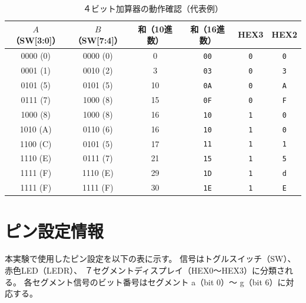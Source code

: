 \documentclass[12pt,a4paper]{ltjsarticle}
\begin{document}
\begin{table}[H]
  \centering
  \caption{４ビット加算器の動作確認（代表例）}
  \label{tab:adder4bits}
  \begin{tabular}{cc|cc|cc}
    \toprule
    $A$（SW{[3:0]}） & $B$（SW{[7:4]}） & 和（10進数） & 和（16進数） & HEX3 & HEX2 \\
    \midrule
    0000 (0) & 0000 (0) &  0 & \texttt{00} & \texttt{0} & \texttt{0} \\
    0001 (1) & 0010 (2) &  3 & \texttt{03} & \texttt{0} & \texttt{3} \\
    0101 (5) & 0101 (5) & 10 & \texttt{0A} & \texttt{0} & \texttt{A} \\
    0111 (7) & 1000 (8) & 15 & \texttt{0F} & \texttt{0} & \texttt{F} \\
    1000 (8) & 1000 (8) & 16 & \texttt{10} & \texttt{1} & \texttt{0} \\
    1010 (A) & 0110 (6) & 16 & \texttt{10} & \texttt{1} & \texttt{0} \\
    1100 (C) & 0101 (5) & 17 & \texttt{11} & \texttt{1} & \texttt{1} \\
    1110 (E) & 0111 (7) & 21 & \texttt{15} & \texttt{1} & \texttt{5} \\
    1111 (F) & 1110 (E) & 29 & \texttt{1D} & \texttt{1} & \texttt{d} \\
    1111 (F) & 1111 (F) & 30 & \texttt{1E} & \texttt{1} & \texttt{E} \\
    \bottomrule
  \end{tabular}
\end{table}

\newpage
\section{ピン設定情報}

本実験で使用したピン設定を以下の表に示す。
信号はトグルスイッチ（SW）、赤色LED（LEDR）、
７セグメントディスプレイ（HEX0〜HEX3）に分類される。
各セグメント信号のビット番号はセグメント a（bit 0）〜 g（bit 6）に対応する。
\end{document}
